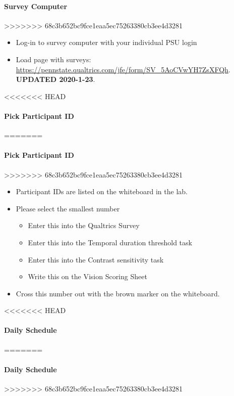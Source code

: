 \documentclass[]{article}
\providecommand{\tightlist}{%
  \setlength{\itemsep}{0pt}\setlength{\parskip}{0pt}}
\let\oldparagraph\paragraph
\renewcommand{\paragraph}[1]{\oldparagraph{#1}\mbox{}}
\begin{document}
\hypertarget{survey-computer}{%
\paragraph{Survey Computer}\label{survey-computer}}
>>>>>>> 68c3b652bc9fce1eaa5ec75263380cb3ee4d3281

\begin{itemize}
\tightlist
\item
  Log-in to survey computer with your individual PSU login
\item
  Load page with surveys:
  \url{https://pennstate.qualtrics.com/jfe/form/SV_5AoCVwYH7ZsXFQh}.
  \textbf{UPDATED 2020-1-23}.
\end{itemize}

<<<<<<< HEAD
\paragraph{Pick Participant ID}\label{pick-participant-id}
=======
\hypertarget{pick-participant-id}{%
\paragraph{Pick Participant ID}\label{pick-participant-id}}
>>>>>>> 68c3b652bc9fce1eaa5ec75263380cb3ee4d3281

\begin{itemize}
\tightlist
\item
  Participant IDs are listed on the whiteboard in the lab.
\item
  Please select the smallest number

  \begin{itemize}
  \tightlist
  \item
    Enter this into the Qualtrics Survey
  \item
    Enter this into the Temporal duration threshold task
  \item
    Enter this into the Contrast sensitivity task
  \item
    Write this on the Vision Scoring Sheet
  \end{itemize}
\item
  Cross this number out with the brown marker on the whiteboard.
\end{itemize}

<<<<<<< HEAD
\paragraph{Daily Schedule}\label{daily-schedule}
=======
\hypertarget{daily-schedule}{%
\paragraph{Daily Schedule}\label{daily-schedule}}
>>>>>>> 68c3b652bc9fce1eaa5ec75263380cb3ee4d3281
\end{document}
